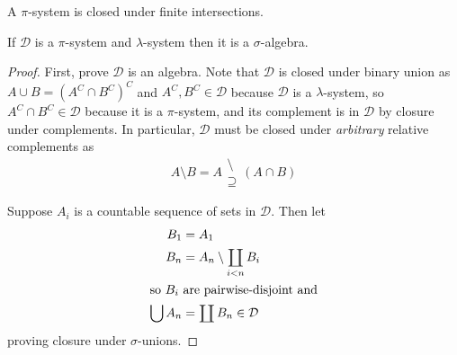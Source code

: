 \documentclass{scrartcl}
\newcommand{\system}{\mathcal D}
\newcommand{\propersetminus}{\begin{smallmatrix} \setminus\\\supseteq \end{smallmatrix}}%
\DeclareMathOperator*{\bigdisjunion}{\coprod}
\begin{document}
\begin{defn}[\(\pi\)-system]
  A \(\pi\)-system is closed under finite intersections.
\end{defn}
\begin{theorem}
  If \(\system\) is a \(\pi\)-system and \(\lambda\)-system then it is a \(\sigma\)-algebra.
\end{theorem}
\begin{proof}
  First, prove \(\system\) is an algebra.
  Note that \(\system\) is closed under binary union as \(A\cup B = (A^C\cap
  B^C)^C \) and \(A^C,B^C\in\system\) because \(\system\) is a \(\lambda\)-system, so
  \(A^C\cap B^C\in\system\) because it is a \(\pi\)-system, and its complement is in
  \(\system\) by closure under complements. In particular, \(\system\) must be
  closed under \emph{arbitrary} relative complements as
  \[
    A\setminus B = A\propersetminus ({A\cap B})
  \]

  Suppose \(A_i\) is a countable sequence of sets in \(\system\). Then let
  \begin{align*}
    B_1 &= A_1 \\
    B_n &= A_n \setminus \bigdisjunion_{i<n}B_{i} \\
    \shortintertext{so \(B_i\) are pairwise-disjoint and}
    \bigcup A_n &= \bigdisjunion B_n \in \system
  \end{align*}
  proving closure under \(\sigma\)-unions.
\end{proof}
\end{document}
